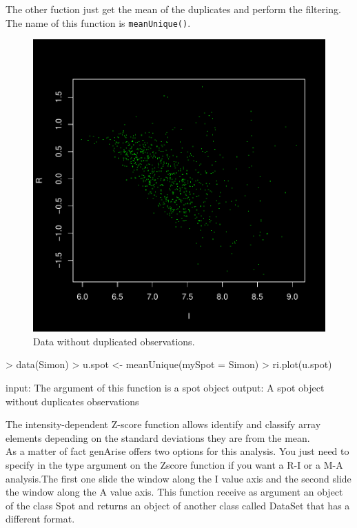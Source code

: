 \documentclass[12pt]{article}
\begin{document}
The other fuction just get the mean of the duplicates and perform the filtering. The name of this function is \texttt{meanUnique()}.

\begin{figure}[h]
\begin{center}
\includegraphics{example-genArise-015}
\caption{Data without duplicated observations.\label{fig11}}
\end{center}
\end{figure}
\begin{Scode}
> data(Simon)
> u.spot <- meanUnique(mySpot = Simon)
> ri.plot(u.spot)
\end{Scode}

\begin{Soutput}
input: The argument of this function is a spot object
output: A spot object without duplicates observations
\end{Soutput}

The intensity-dependent Z-score function allows identify and classify array elements depending on the standard deviations they are from the mean.\\

As a matter of fact genArise offers two options for this analysis. You just need to specify in the type argument on the Zscore function if you want a R-I or a M-A analysis.The first one slide the window along the I value axis and the second slide the window along the A value axis. This function receive as argument an object of the class Spot and returns an object of another class called DataSet that has a different format.\\
\end{document}
